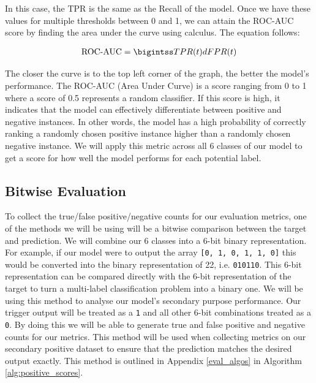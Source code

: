 In this case, the TPR is the same as the Recall of the model. Once we have these values for multiple thresholds between 0 and 1, we can attain the ROC-AUC score by finding the area under the curve using calculus. The equation follows:

\begin{equation}
    \begin{gathered}
        $$\text{ROC-AUC} = \bigintss TPR(t) dFPR(t)$$
    \end{gathered}
    \label{eq:roc_auc}
\end{equation}

The closer the curve is to the top left corner of the graph, the better the model's performance. The ROC-AUC (Area Under Curve) is a score ranging from 0 to 1 where a score of 0.5 represents a random classifier. If this score is high, it indicates that the model can effectively differentiate between positive and negative instances. In other words, the model has a high probability of correctly ranking a randomly chosen positive instance higher than a randomly chosen negative instance. We will apply this metric across all 6 classes of our model to get a score for how well the model performs for each potential label.

\subsection{Bitwise Evaluation}

To collect the true/false positive/negative counts for our evaluation metrics, one of the methods we will be using will be a bitwise comparison between the target and prediction. We will combine our 6 classes into a 6-bit binary representation. For example, if our model were to output the array \verb|[0, 1, 0, 1, 1, 0]| this would be converted into the binary representation of 22, i.e. \verb|010110|. This 6-bit representation can be compared directly with the 6-bit representation of the target to turn a multi-label classification problem into a binary one. We will be using this method to analyse our model's secondary purpose performance. Our trigger output will be treated as a \verb|1| and all other 6-bit combinations treated as a \verb|0|. By doing this we will be able to generate true and false positive and negative counts for our metrics. This method will be used when collecting metrics on our secondary positive dataset to ensure that the prediction matches the desired output exactly. This method is outlined in Appendix \ref{eval_algos} in Algorithm \ref{alg:positive_scores}.

